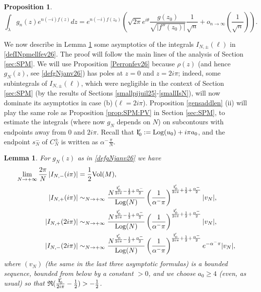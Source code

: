 \documentclass[11pt]{amsart}
\newtheorem{lem}[teo]{Lemma}
\newtheorem{prop}[teo]{Proposition}
\newcommand{\Log}{{\rm Log}}
\begin{document}
{\begin{prop}
$$ \int_{\lambda} g_n(z)  e^{n (-i) f(z)} dz = e^{n (-i) f(z_0)} \left ( \sqrt{2\pi} e^{i \theta} \dfrac{g(z_0)}{\sqrt{|f''(z_0)|}}\dfrac{1}{\sqrt{n}} + o_{n \to \infty}\left(\frac{1}{\sqrt{n}}\right) \right ).$$
\end{prop}
We now describe in Lemma \ref{lem:reformintqjui25} some asymptotics of the integrals $I_{N,\pm}(\ell)$ in \eqref{defINpmellfev26}. The proof will follow the main lines of the analysis of Section \ref{sec:SPM}. We will use Proposition \ref{Perronfev26} because $\rho(z)$ (and hence $g_N(z)$, see \eqref{defgNjanv26}) has poles at $z=0$ and $z=2i\pi$; indeed, some subintegrals of $I_{N,\pm}(\ell)$, which were negligible in the context of Section \ref{sec:SPM} (by the results of Sections \ref{smallpijuil25}-\ref{smallIsN}), will now dominate its asymptotics in case (b) ($\ell = 2i\pi$). Proposition \ref{gensaddlen} (ii) will play the same role as Proposition \ref{prop:SPM:PV} in Section  \ref{sec:SPM}, to estimate the integrals (where now $g_N$ depends on $N$) on subcontours with endpoints away from $0$ and $2i\pi$. Recall that ${\bf l}_0' := \Log(u_{0}) +i\pi a_0$, and the endpoint $s_N^-$ of $C_N^\pm$ is written as $\textstyle \alpha^-\frac{\pi}{N}$.
\begin{lem}\label{lem:reformintqjui25} For $g_N(z)$ as in \eqref{defgNjanv26} we have
\begin{align*} \lim_{N\to +\infty} \frac{2\pi}{N}\left\vert I_{N,-}(i\pi) \right\vert & = \frac{1}{2}{\rm Vol}(M),\\
\vert I_{N,+}(i\pi) \vert & \sim_{N\to +\infty} \dfrac{N^{\frac{{\bf l}_0'}{2i\pi}-\frac{1}{2}+\frac{\alpha^-}{2}}}{\Log(N)} \left(\frac{1}{\alpha^-\pi}\right)^{\frac{{\bf l}_0'}{2i\pi}+\frac{1}{2}+\frac{\alpha^-}{2}} \vert v_N\vert,\\
\vert I_{N,+}(2i\pi) \vert & \sim_{N\to +\infty} \dfrac{N^{\frac{{\bf l}_0'}{2i\pi}-\frac{1}{2}+\frac{\alpha^-}{2}}}{\Log(N)} \left(\frac{1}{\alpha^-\pi}\right)^{\frac{{\bf l}_0'}{2i\pi}+\frac{1}{2}+\frac{\alpha^-}{2}}\vert v_N\vert,\\ 
\vert I_{N,-}(2i\pi) \vert  & \sim_{N\to +\infty} \dfrac{N^{\frac{{\bf l}_0'}{2i\pi}-\frac{1}{2}+\frac{\alpha^-}{2}}}{\Log(N)} \left(\frac{1}{\alpha^-\pi}\right)^{\frac{{\bf l}_0'}{2i\pi}+\frac{1}{2}+\frac{\alpha^-}{2}} e^{-\alpha^-\pi}\vert v_N\vert, 
\end{align*}
where $(v_N)$  (the same in the last three asymptotic formulas) is a bounded sequence, bounded from below by a constant $>0$, and we choose $a_0\geq 4$ (even, as usual) so that $\textstyle \mathfrak{R}(\frac{{\bf l}_0'}{2i\pi}-\frac{1}{2}) >-\frac{1}{2}$. 
\end{lem}
\medskip

}
\end{document}
